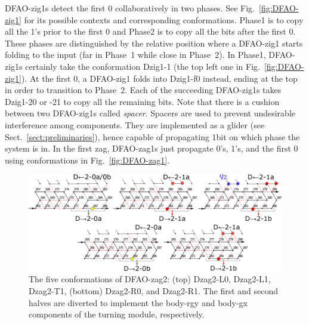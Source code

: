 DFAO-zig1s detect the first 0 collaboratively in two phases.
See Fig.~\ref{fig:DFAO-zig1} for its possible contexts and corresponding conformations. 
Phase1 is to copy all the 1's prior to the first 0 and Phase2 is to copy all the bits after the first 0.
These phases are distinguished by the relative position where a DFAO-zig1 starts folding to the input (far in Phase~1 while close in Phase~2).
In Phase1, DFAO-zig1s certainly take the conformation Dzig1-1 (the top left one in Fig.~\ref{fig:DFAO-zig1}).
At the first 0, a DFAO-zig1 folds into Dzig1-f0 instead, ending at the top in order to transition to Phase~2.
Each of the succeeding DFAO-zig1s takes Dzig1-20 or -21 to copy all the remaining bits. 
Note that there is a cushion between two DFAO-zig1s called \textit{spacer}.
Spacers are used to prevent undesirable interference among components.
They are implemented as a glider (see Sect.~\ref{sect:preliminaries}), hence capable of propagating 1bit on which phase the system is in.
In the first zag, DFAO-zag1s just propagate 0's, 1's, and the first 0 using conformations in Fig.~\ref{fig:DFAO-zag1}.




\begin{figure}[h]
\includegraphics[width=\linewidth]{pic/DFAO-zag2.png}
\caption{The five conformations of DFAO-zag2: (top) Dzag2-L0, Dzag2-L1, Dzag2-T1, (bottom) Dzag2-R0, and Dzag2-R1.
The first and second halves are diverted to implement the body-rgy and body-gx components of the turning module, respectively. 
}
\label{fig:DFAO-zag2}
  \end{figure} 

